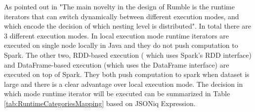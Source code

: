 As pointed out in \cite{RumblePaper} "The main novelty in the design of Rumble is the runtime iterators that can switch dynamically between different execution modes, and which encode the decision of which nesting level is distributed". In total there are 3 different execution modes. In local execution mode runtime iterators are executed on single node locally in Java and they do not push computation to Spark. The other two, RDD-based execution ( which uses Spark’s RDD interface) and  DataFrame-based execution (which uses the DataFrame interface) are executed on top of Spark. They both push computation to spark when dataset is large and there is a clear advantage over local execution mode. The decision in which mode runtime iterator will be executed can be summarized in Table \ref{tab:RuntimeCategoriesMapping} based on JSONiq Expression. 

\begin{table}[h!]
	\caption{Runtime iterator categorization for JSONiq expressions and clauses}
	\label{tab:RuntimeCategoriesMapping}
\end{table}


